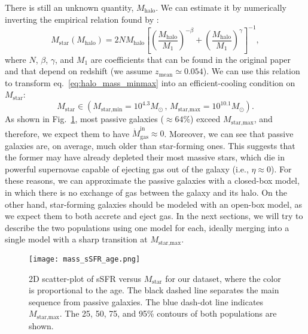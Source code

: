 \documentclass[fleqn,usenatbib]{mnras}
\begin{document}
\smallskip
There is still an unknown quantity, $M_\text{halo}$. We can estimate it by numerically inverting the empirical relation found by \citet{Moster_2012}:
\begin{equation}
    M_\text{star} \left(M_\text{halo}\right) = 2N M_\text{halo} \left[\left(\dfrac{M_\text{halo}}{M_1}\right)^{-\beta} + \left(\dfrac{M_\text{halo}}{M_1}\right)^\gamma\right]^{-1},
	\label{eq:moster}
\end{equation}
where $N$, $\beta$, $\gamma$, and $M_1$ are coefficients that can be found in the original paper and that depend on redshift (we assume $z_{\text{mean}} \simeq 0.054$). We can use this relation to transform eq.~\ref{eq:halo_mass_minmax} into an efficient-cooling condition on $M_\text{star}$:
\begin{equation}
    M_\text{star} \in \left( M_\text{star,min}=10^{4.3} M_\odot \, , \, M_\text{star,max}=10^{10.1} M_\odot \right).
	\label{eq:star_mass_minmax}
\end{equation}
As shown in Fig.~\ref{fig:mass_sSFR_age}, most passive galaxies ($\approx 64\%$) exceed $M_\text{star,max}$, and therefore, we expect them to have $\dot{M}_\text{gas}^\text{in} \approx 0$.
Moreover, we can see that passive galaxies are, on average, much older than star-forming ones. This suggests that the former may have already depleted their most massive stars, which die in powerful supernovae capable of ejecting gas out of the galaxy (i.e., $\eta \approx 0$). For these reasons, we can approximate the passive galaxies with a closed-box model, in which there is no exchange of gas between the galaxy and its halo. On the other hand, star-forming galaxies should be modeled with an open-box model, as we expect them to both accrete and eject gas. In the next sections, we will try to describe the two populations using one model for each, ideally merging into a single model with a sharp transition at $M_\text{star,max}$.
\begin{figure}\centering
	\texttt{[image: mass\_sSFR\_age.png]}
    \caption{2D scatter-plot of sSFR versus $M_\text{star}$ for our dataset, where the color is proportional to the age. The black dashed line separates the main sequence from passive galaxies. The blue dash-dot line indicates $M_\text{star,max}$. The 25, 50, 75, and 95\% contours of both populations are shown.}
    \label{fig:mass_sSFR_age}
\end{figure}
\end{document}
